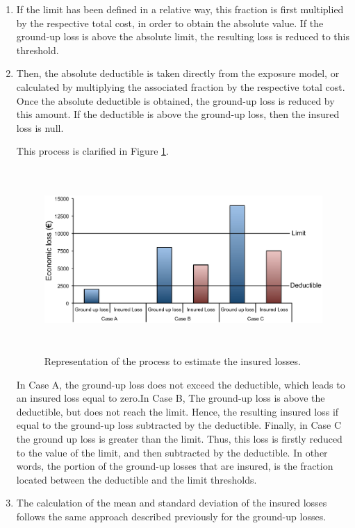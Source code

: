 \begin{enumerate}

\item If the limit has been defined in a relative way, this fraction is first multiplied by the respective total cost, in order to obtain the absolute value. If the ground-up loss is above the absolute limit, the resulting loss is reduced to this threshold.

\item Then, the absolute deductible is taken directly from the exposure model, or calculated by multiplying the associated fraction by the respective total cost. Once the absolute deductible is obtained, the ground-up loss is reduced by this amount. If the deductible is above the ground-up loss, then the insured loss is null.

This process is clarified in Figure \ref{fig:insuredLosses}.

\begin{figure}[ht]
\centering
\includegraphics[width=14cm,height=7cm]{./figures/risk/insuredLosses.eps}
\caption{Representation of the process to estimate the insured losses.}
\label{fig:insuredLosses}
\end{figure} 

In Case A, the ground-up loss does not exceed the deductible, which leads to an insured loss equal to zero.In Case B, The ground-up loss is above the deductible, but does not reach the limit. Hence, the resulting insured loss if equal to the ground-up loss subtracted by the deductible. Finally, in Case C the ground up loss is greater than the limit. Thus, this loss is firstly reduced to the value of the limit, and then subtracted by the deductible. In other words, the portion of the ground-up losses that are insured, is the fraction located between the deductible and the limit thresholds.   

\item The calculation of the mean and standard deviation of the insured losses follows the same approach described previously for the ground-up losses.

\end{enumerate}

